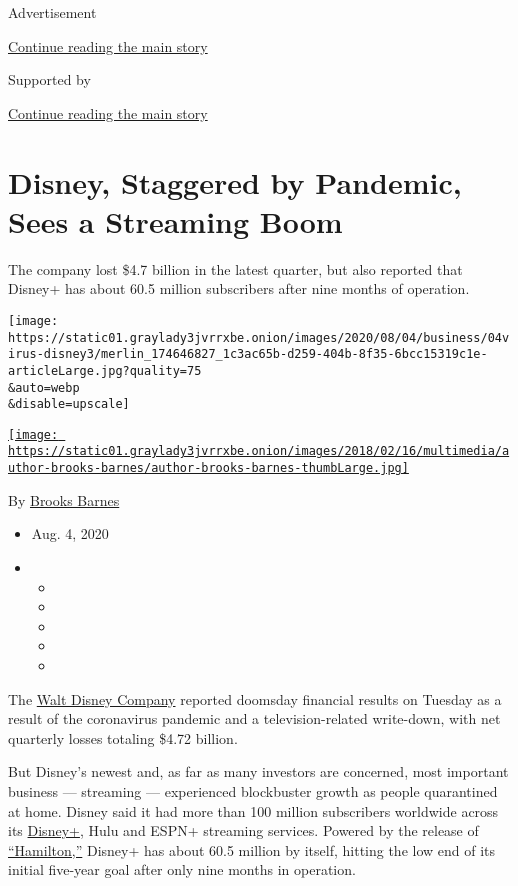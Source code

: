 Advertisement

\protect\hyperlink{after-top}{Continue reading the main story}

Supported by

\protect\hyperlink{after-sponsor}{Continue reading the main story}

\hypertarget{disney-staggered-by-pandemic-sees-a-streaming-boom}{%
\section{Disney, Staggered by Pandemic, Sees a Streaming
Boom}\label{disney-staggered-by-pandemic-sees-a-streaming-boom}}

The company lost \$4.7 billion in the latest quarter, but also reported
that Disney+ has about 60.5 million subscribers after nine months of
operation.

\texttt{[image: https://static01.graylady3jvrrxbe.onion/images/2020/08/04/business/04virus-disney3/merlin\_174646827\_1c3ac65b-d259-404b-8f35-6bcc15319c1e-articleLarge.jpg?quality=75\\\&auto=webp\\\&disable=upscale]}

\href{https://www.nytimes3xbfgragh.onion/by/brooks-barnes}{\texttt{[image: https://static01.graylady3jvrrxbe.onion/images/2018/02/16/multimedia/author-brooks-barnes/author-brooks-barnes-thumbLarge.jpg]}}

By \href{https://www.nytimes3xbfgragh.onion/by/brooks-barnes}{Brooks
Barnes}

\begin{itemize}
\item
  Aug. 4, 2020
\item
  \begin{itemize}
  \item
  \item
  \item
  \item
  \item
  \end{itemize}
\end{itemize}

The
\href{https://www.nytimes3xbfgragh.onion/2020/05/04/business/media/coronavirus-disney.html?searchResultPosition=3}{Walt
Disney Company} reported doomsday financial results on Tuesday as a
result of the coronavirus pandemic and a television-related write-down,
with net quarterly losses totaling \$4.72 billion.

But Disney's newest and, as far as many investors are concerned, most
important business --- streaming --- experienced blockbuster growth as
people quarantined at home. Disney said it had more than 100 million
subscribers worldwide across its
\href{https://www.nytimes3xbfgragh.onion/2020/04/08/business/disney-plus-50-million-subscribers.html}{Disney+},
Hulu and ESPN+ streaming services. Powered by the release of
\href{https://www.nytimes3xbfgragh.onion/2020/06/30/movies/hamilton-review-disney-plus.html?searchResultPosition=4}{``Hamilton,''}
Disney+ has about 60.5 million by itself, hitting the low end of its
initial five-year goal after only nine months in operation.

